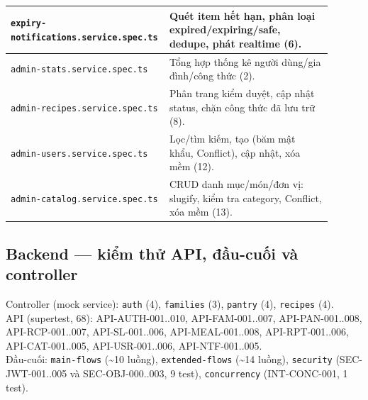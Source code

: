 \documentclass[12pt,a4paper]{article}
\newcommand{\code}[1]{\texttt{#1}}
\newcommand{\fpath}[1]{\nolinkurl{#1}}
\begin{document}
\begin{longtable}{|>{\raggedright\arraybackslash}p{0.40\linewidth}|>{\raggedright\arraybackslash}p{0.50\linewidth}|}
\hline
\fpath{expiry-notifications.service.spec.ts} & Quét item hết hạn, phân loại expired/expiring/safe, dedupe, phát realtime (6). \\
\hline
\fpath{admin-stats.service.spec.ts} & Tổng hợp thống kê người dùng/gia đình/công thức (2). \\
\hline
\fpath{admin-recipes.service.spec.ts} & Phân trang kiểm duyệt, cập nhật status, chặn công thức đã lưu trữ (8). \\
\hline
\fpath{admin-users.service.spec.ts} & Lọc/tìm kiếm, tạo (băm mật khẩu, Conflict), cập nhật, xóa mềm (12). \\
\hline
\fpath{admin-catalog.service.spec.ts} & CRUD danh mục/món/đơn vị: slugify, kiểm tra category, Conflict, xóa mềm (13). \\
\hline
\end{longtable}

\subsection{Backend --- kiểm thử API, đầu-cuối và controller}
Controller (mock service): \code{auth} (4), \code{families} (3), \code{pantry} (4), \code{recipes} (4). \\
API (supertest, 68): API-AUTH-001..010, API-FAM-001..007, API-PAN-001..008, API-RCP-001..007,
API-SL-001..006, API-MEAL-001..008, API-RPT-001..006, API-CAT-001..005, API-USR-001..006, API-NTF-001..005. \\
Đầu-cuối: \code{main-flows} (\textasciitilde 10 luồng), \code{extended-flows} (\textasciitilde 14 luồng),
\code{security} (SEC-JWT-001..005 và SEC-OBJ-000..003, 9 test), \code{concurrency} (INT-CONC-001, 1 test).
\end{document}
